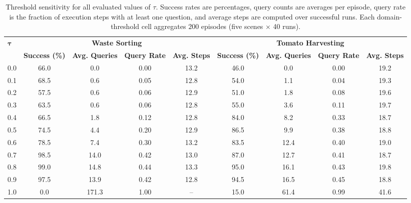 \begin{table}[t]
\centering
\caption{Threshold sensitivity for all evaluated values of $\tau$. Success rates are percentages, query counts are averages per episode, query rate is the fraction of execution steps with at least one question, and average steps are computed over successful runs. Each domain-threshold cell aggregates $200$ episodes (five scenes $\times$ 40 runs).}
\label{tab:sys_tau}
\footnotesize
\setlength{\tabcolsep}{2pt}
\begin{tabular*}{\textwidth}{@{\extracolsep{\fill}}lcccccccc}
\toprule
\multirow{2}{*}{$\boldsymbol{\tau}$} & \multicolumn{4}{c}{\textbf{Waste Sorting}} & \multicolumn{4}{c}{\textbf{Tomato Harvesting}} \\
\cmidrule(lr){2-5}\cmidrule(lr){6-9}
& \textbf{Success (\%)} & \textbf{Avg. Queries} & \textbf{Query Rate} & \textbf{Avg. Steps} & \textbf{Success (\%)} & \textbf{Avg. Queries} & \textbf{Query Rate} & \textbf{Avg. Steps} \\
\midrule
0.0 & 66.0 & 0.0 & 0.00 & 13.2 & 46.0 & 0.0 & 0.00 & 19.2 \\
0.1 & 68.5 & 0.6 & 0.05 & 12.8 & 54.0 & 1.1 & 0.04 & 19.3 \\
0.2 & 57.5 & 0.6 & 0.06 & 12.9 & 51.0 & 1.8 & 0.08 & 19.6 \\
0.3 & 63.5 & 0.6 & 0.06 & 12.8 & 55.0 & 3.6 & 0.11 & 19.7 \\
0.4 & 66.5 & 1.8 & 0.12 & 12.8 & 84.0 & 8.2 & 0.33 & 18.7 \\
0.5 & 74.5 & 4.4 & 0.20 & 12.9 & 86.5 & 9.9 & 0.38 & 18.8 \\
0.6 & 78.5 & 7.4 & 0.30 & 13.2 & 83.5 & 12.4 & 0.40 & 19.0 \\
0.7 & 98.5 & 14.0 & 0.42 & 13.0 & 87.0 & 12.7 & 0.41 & 18.7 \\
0.8 & 99.0 & 14.8 & 0.44 & 13.3 & 95.0 & 16.1 & 0.43 & 19.8 \\
0.9 & 97.5 & 13.9 & 0.42 & 12.8 & 94.5 & 16.5 & 0.45 & 18.8 \\
1.0 & 0.0 & 171.3 & 1.00 & -- & 15.0 & 61.4 & 0.99 & 41.6 \\
\bottomrule
\end{tabular*}
\end{table}

